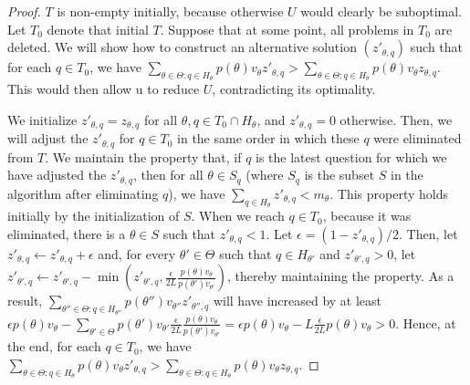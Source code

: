 \documentclass{article}
\begin{document}
\begin{proof}
$T$ is non-empty initially, because otherwise $U$ would clearly be suboptimal.
Let $T_0$ denote that initial $T$.  Suppose that at some point, all
problems in $T_0$ are deleted.  We will show how to construct an
alternative solution $(z'_{\theta,q})$ such that for each $q \in T_0$, we
have 
$\sum_{\theta \in
  \Theta: q \in H_\theta}p(\theta)v_\theta z'_{\theta,q} > \sum_{\theta \in
  \Theta: q \in H_\theta}p(\theta)v_\theta z_{\theta,q}$.  This would then allow u
  to reduce $U$, contradicting its optimality.

  We initialize $z'_{\theta,q} = z_{\theta, q}$ for all $\theta, q \in T_0
  \cap H_\theta$, and $z'_{\theta,q} = 0$ otherwise.  Then, we will adjust
  the $z'_{\theta, q}$ for $q \in T_0$ in the same order in which these $q$
  were eliminated from $T$.  We maintain the property that, if $q$ is the
  latest question for which we have adjusted the $z'_{\theta,q}$, then for
  all $\theta \in S_q$ (where $S_q$ is the subset $S$ in the algorithm
  after eliminating $q$), we have $\sum_{q \in H_\theta} z'_{\theta,q} <
  m_\theta$.  This property holds initially by the initialization of $S$.
  When we reach $q \in T_0$, because it was eliminated, there is a $\theta
  \in S$ such that $z'_{\theta,q} < 1$. Let $\epsilon = (1 - z'_{\theta,q})/2$.
Then, let $z'_{\theta,q} \leftarrow z'_{\theta,q} + \epsilon$ and, for
every $\theta' \in \Theta$ such that $q \in H_{\theta'}$ and $z'_{\theta',q}
>0$, let  $z'_{\theta',q} \leftarrow  z'_{\theta',q} - \min(z'_{\theta',q},
\frac{\epsilon}{2 L} \frac{p(\theta)v_\theta}{p(\theta')v_{\theta'}})$,
thereby maintaining the property.  
As a result, $\sum_{\theta'' \in
  \Theta: q \in H_{\theta''}}p(\theta'')v_{\theta''} z'_{\theta'',q}$ will have
increased by at least  $\epsilon p(\theta)v_{\theta} - \sum_{\theta' \in
\Theta} p(\theta')v_{\theta'} \frac{\epsilon}{2 L}
\frac{p(\theta)v_\theta}{p(\theta')v_{\theta'}}  = 
\epsilon p(\theta)v_{\theta} - L \frac{\epsilon}{2 L} p(\theta)v_\theta >0$.
Hence, at the end, for each $q \in T_0$, we
have 
$\sum_{\theta \in
  \Theta: q \in H_\theta}p(\theta)v_\theta z'_{\theta,q} > \sum_{\theta \in
  \Theta: q \in H_\theta}p(\theta)v_\theta z_{\theta,q}$.
\end{proof}
\end{document}
